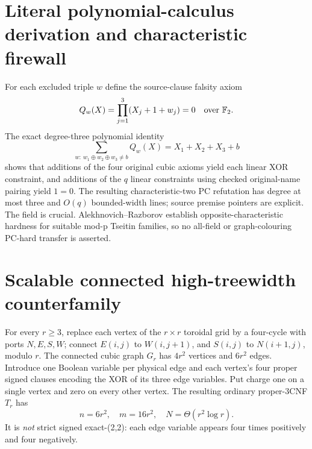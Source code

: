 \documentclass[11pt]{article}
\begin{document}
\section{Literal polynomial-calculus derivation and characteristic firewall}
For each excluded triple \(w\) define the source-clause falsity axiom
\[
Q_w(X)=\prod_{j=1}^3(X_j+1+w_j)=0\quad\hbox{over }\mathbb F_2.
\]
The exact degree-three polynomial identity
\[
\sum_{w:\ w_1\oplus w_2\oplus w_3\ne b}Q_w(X)
=X_1+X_2+X_3+b
\]
shows that additions of the four original cubic axioms yield each linear XOR constraint, and additions of the \(q\) linear constraints using checked original-name pairing yield \(1=0\). The resulting characteristic-two PC refutation has degree at most three and \(O(q)\) bounded-width lines; source premise pointers are explicit. The field is crucial. Alekhnovich--Razborov establish opposite-characteristic hardness for suitable mod-p Tseitin families, so no all-field or graph-colouring PC-hard transfer is asserted.

\section{Scalable connected high-treewidth counterfamily}
For every \(r\ge3\), replace each vertex of the \(r\times r\) toroidal grid by a four-cycle with ports \(N,E,S,W\); connect \(E(i,j)\) to \(W(i,j+1)\), and \(S(i,j)\) to \(N(i+1,j)\), modulo \(r\). The connected cubic graph \(G_r\) has \(4r^2\) vertices and \(6r^2\) edges. Introduce one Boolean variable per physical edge and each vertex's four proper signed clauses encoding the XOR of its three edge variables. Put charge one on a single vertex and zero on every other vertex. The resulting ordinary proper-3CNF \(T_r\) has
\[
n=6r^2,\quad m=16r^2,\quad N=\Theta(r^2\log r).
\]
It is \emph{not} strict signed exact-(2,2): each edge variable appears four times positively and four negatively.
\end{document}
